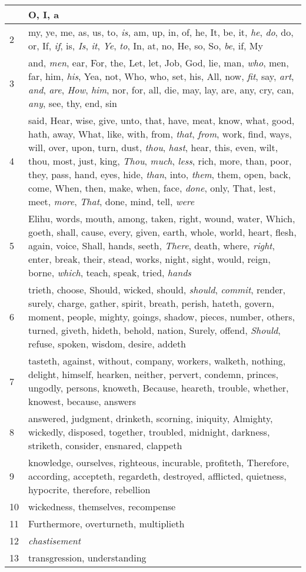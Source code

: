 \begin{longtable}{l|p{3.75in}}
\hline \hline
\endlastfoot
1 & O, I, a \\ \hline
2 & my, ye, me, as, us, to, \emph{is}, am, up, in, of, he, It, be, it, \emph{he}, \emph{do}, do, or, If, \emph{if}, is, \emph{Is}, \emph{it}, \emph{Ye}, \emph{to}, In, at, no, He, so, So, \emph{be}, if, My \\ \hline
3 & and, \emph{men}, ear, For, the, Let, let, Job, God, lie, man, \emph{who}, men, far, him, \emph{his}, Yea, not, Who, who, set, his, All, now, \emph{fit}, say, \emph{art}, \emph{and}, \emph{are}, \emph{How}, \emph{him}, nor, for, all, die, may, lay, are, any, cry, can, \emph{any}, see, thy, end, sin \\ \hline
4 & said, Hear, wise, give, unto, that, have, meat, know, what, good, hath, away, What, like, with, from, \emph{that}, \emph{from}, work, find, ways, will, over, upon, turn, dust, \emph{thou}, \emph{hast}, hear, this, even, wilt, thou, most, just, king, \emph{Thou}, \emph{much}, \emph{less}, rich, more, than, poor, they, pass, hand, eyes, hide, \emph{than}, into, \emph{them}, them, open, back, come, When, then, make, when, face, \emph{done}, only, That, lest, meet, \emph{more}, \emph{That}, done, mind, tell, \emph{were} \\ \hline
5 & Elihu, words, mouth, among, taken, right, wound, water, Which, goeth, shall, cause, every, given, earth, whole, world, heart, flesh, again, voice, Shall, hands, seeth, \emph{There}, death, where, \emph{right}, enter, break, their, stead, works, night, sight, would, reign, borne, \emph{which}, teach, speak, tried, \emph{hands} \\ \hline
6 & trieth, choose, Should, wicked, should, \emph{should}, \emph{commit}, render, surely, charge, gather, spirit, breath, perish, hateth, govern, moment, people, mighty, goings, shadow, pieces, number, others, turned, giveth, hideth, behold, nation, Surely, offend, \emph{Should}, refuse, spoken, wisdom, desire, addeth \\ \hline
7 & tasteth, against, without, company, workers, walketh, nothing, delight, himself, hearken, neither, pervert, condemn, princes, ungodly, persons, knoweth, Because, heareth, trouble, whether, knowest, because, answers \\ \hline
8 & answered, judgment, drinketh, scorning, iniquity, Almighty, wickedly, disposed, together, troubled, midnight, darkness, striketh, consider, ensnared, clappeth \\ \hline
9 & knowledge, ourselves, righteous, incurable, profiteth, Therefore, according, accepteth, regardeth, destroyed, afflicted, quietness, hypocrite, therefore, rebellion \\ \hline
10 & wickedness, themselves, recompense \\ \hline
11 & Furthermore, overturneth, multiplieth \\ \hline
12 & \emph{chastisement} \\ \hline
13 & transgression, understanding \\ \hline
\end{longtable}






